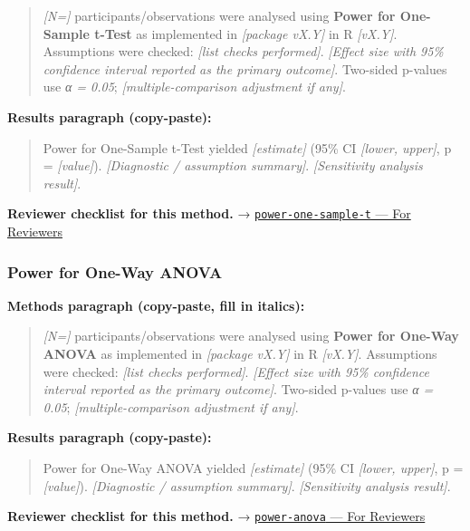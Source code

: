 \documentclass[
]{article}
\begin{document}
\begin{quote}
\emph{{[}N={]}} participants/observations were analysed using
\textbf{Power for One-Sample t-Test} as implemented in \emph{{[}package
vX.Y{]}} in R \emph{{[}vX.Y{]}}. Assumptions were checked: \emph{{[}list
checks performed{]}}. \emph{{[}Effect size with 95\% confidence interval
reported as the primary outcome{]}}. Two-sided p-values use \emph{α =
0.05}; \emph{{[}multiple-comparison adjustment if any{]}}.
\end{quote}

\textbf{Results paragraph (copy-paste):}

\begin{quote}
Power for One-Sample t-Test yielded \emph{{[}estimate{]}} (95\% CI
\emph{{[}lower, upper{]}}, p = \emph{{[}value{]}}). \emph{{[}Diagnostic
/ assumption summary{]}}. \emph{{[}Sensitivity analysis result{]}}.
\end{quote}

\textbf{Reviewer checklist for this method.} →
\href{../chapters/05-power/power-one-sample-t.Rmd\#for-reviewers}{\texttt{power-one-sample-t}
--- For Reviewers}

\subsubsection{Power for One-Way ANOVA}\label{power-for-one-way-anova}

\textbf{Methods paragraph (copy-paste, fill in italics):}

\begin{quote}
\emph{{[}N={]}} participants/observations were analysed using
\textbf{Power for One-Way ANOVA} as implemented in \emph{{[}package
vX.Y{]}} in R \emph{{[}vX.Y{]}}. Assumptions were checked: \emph{{[}list
checks performed{]}}. \emph{{[}Effect size with 95\% confidence interval
reported as the primary outcome{]}}. Two-sided p-values use \emph{α =
0.05}; \emph{{[}multiple-comparison adjustment if any{]}}.
\end{quote}

\textbf{Results paragraph (copy-paste):}

\begin{quote}
Power for One-Way ANOVA yielded \emph{{[}estimate{]}} (95\% CI
\emph{{[}lower, upper{]}}, p = \emph{{[}value{]}}). \emph{{[}Diagnostic
/ assumption summary{]}}. \emph{{[}Sensitivity analysis result{]}}.
\end{quote}

\textbf{Reviewer checklist for this method.} →
\href{../chapters/05-power/power-anova.Rmd\#for-reviewers}{\texttt{power-anova}
--- For Reviewers}
\end{document}
